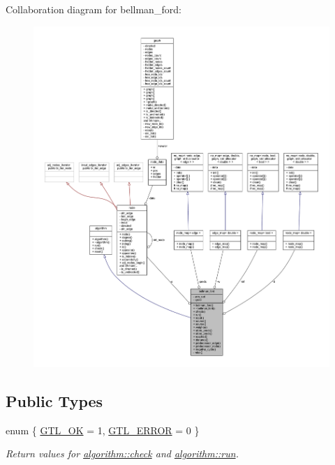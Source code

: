 Collaboration diagram for bellman\+\_\+ford\+:\nopagebreak
\begin{figure}[H]
\begin{center}
\leavevmode
\includegraphics[width=350pt]{classbellman__ford__coll__graph}
\end{center}
\end{figure}
\subsection*{Public Types}
\begin{DoxyCompactItemize}
\item 
enum \{ \mbox{\hyperlink{classalgorithm_af1a0078e153aa99c24f9bdf0d97f6710a5114c20e4a96a76b5de9f28bf15e282b}{G\+T\+L\+\_\+\+OK}} = 1, 
\mbox{\hyperlink{classalgorithm_af1a0078e153aa99c24f9bdf0d97f6710a6fcf574690bbd6cf710837a169510dd7}{G\+T\+L\+\_\+\+E\+R\+R\+OR}} = 0
 \}
\begin{DoxyCompactList}\small\item\em Return values for \mbox{\hyperlink{classalgorithm_a76361fb03ad1cf643affc51821e43bed}{algorithm\+::check}} and \mbox{\hyperlink{classalgorithm_a734b189509a8d6b56b65f8ff772d43ca}{algorithm\+::run}}. \end{DoxyCompactList}\end{DoxyCompactItemize}
